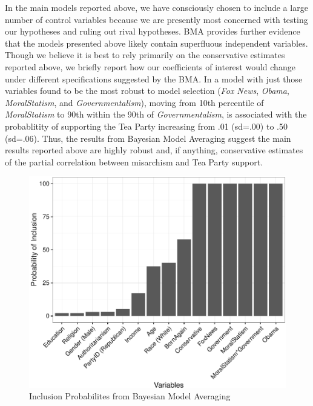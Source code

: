 \documentclass[12pt,]{article}
\begin{document}
In the main models reported above, we have consciously chosen to include
a large number of control variables because we are presently most
concerned with testing our hypotheses and ruling out rival hypotheses.
BMA provides further evidence that the models presented above likely
contain superfluous independent variables. Though we believe it is best
to rely primarily on the conservative estimates reported above, we
briefly report how our coefficients of interest would change under
different specifications suggested by the BMA. In a model with just
those variables found to be the most robust to model selection
(\emph{Fox News}, \emph{Obama}, \emph{MoralStatism}, and
\emph{Governmentalism}), moving from 10th percentile of
\emph{MoralStatism} to 90th within the 90th of \emph{Governmentalism},
is associated with the probablitity of supporting the Tea Party
increasing from .01 (sd=.00) to .50 (sd=.06). Thus, the results from
Bayesian Model Averaging suggest the main results reported above are
highly robust and, if anything, conservative estimates of the partial
correlation between misarchism and Tea Party support.

\begin{figure}[htbp]
\centering
\includegraphics{figures/bma2-1.pdf}
\caption{Inclusion Probabilites from Bayesian Model Averaging}
\end{figure}

\clearpage
\end{document}
